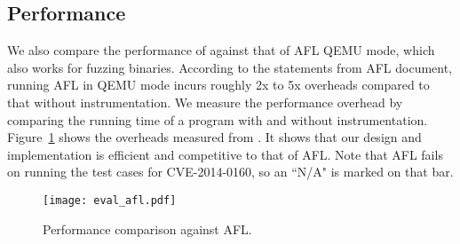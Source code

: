 \subsection{Performance}

We also compare the performance of \sys against that of AFL QEMU mode, which also works for fuzzing binaries.
According to the statements from AFL document, running AFL in QEMU mode incurs roughly 2x to 5x overheads compared to that without instrumentation.
We measure the performance overhead by comparing the running time of a program with and without instrumentation.
Figure~\ref{fig:afl} shows the overheads measured from \sys. It shows that our design and implementation is efficient and competitive to that of AFL.
Note that AFL fails on running the test cases for CVE-2014-0160, so an ``N/A" is marked on that bar.

\begin{figure}
\centering
\texttt{[image: eval\_afl.pdf]}
\caption{Performance comparison against AFL.}
\label{fig:afl}
\end{figure}

